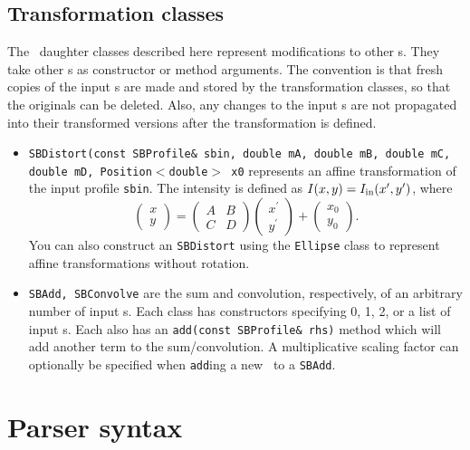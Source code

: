 \documentclass[11pt,preprint,flushrt]{aastex}
\begin{document}
\subsection{Transformation classes}
The \sbp\ daughter classes described here represent modifications to other {\sbp}s.  They take other {\sbp}s as constructor or method arguments.  The convention is that fresh copies of the input {\sbp}s are made and stored by the transformation classes, so that the originals can be deleted.  Also, any changes to the input {\sbp}s are not propagated into their transformed versions after the transformation is defined.
\begin{itemize}
\item {\tt SBDistort(const SBProfile\& sbin, double mA, double mB, double mC, double mD, Position$<$double$>$ x0} represents an affine transformation of the input profile {\tt sbin}.  The intensity is defined as $I(x,y) = I_{\rm in}(x^\prime,y^\prime)$, where
\begin{equation}
\left( \begin{array}{c} x \\ y \end{array} \right)
= 
\left( \begin{array}{cc}
A & B \\
C & D 
\end{array} \right)
\left( \begin{array}{c} x^\prime \\ y^\prime \end{array} \right)
+ 
\left( \begin{array}{c} x_0 \\ y_0 \end{array} \right).
\end{equation}
You can also construct an {\tt SBDistort} using the {\tt Ellipse} class to represent affine transformations without rotation.
\item {\tt SBAdd, SBConvolve} are the sum and convolution, respectively, of an arbitrary number of input {\sbp}s.  Each class has constructors specifying 0, 1, 2, or a list of input {\sbp}s.  Each also has an {\tt add(const SBProfile\& rhs)} method which will add another term to the sum/convolution.  A multiplicative scaling factor can optionally be specified when {\tt add}ing a new \sbp\ to a {\tt SBAdd}.
\end{itemize}

\section{Parser syntax}
\end{document}
